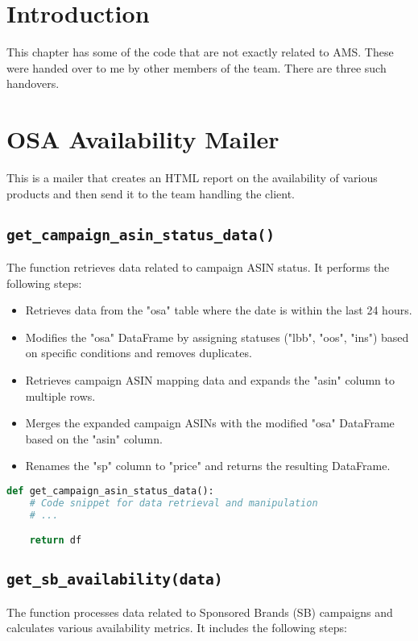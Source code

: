 \section{Introduction}

This chapter has some of the code that are not exactly related to AMS. These were handed over to me by other members of the team. There are three such handovers.

\section{OSA Availability Mailer}

This is a mailer that creates an HTML report on the availability of various products and then send it to the team handling the client.

\subsection{\texttt{get\_campaign\_asin\_status\_data()}}
The function retrieves data related to campaign ASIN status. It performs the following steps:
\begin{itemize}
    \item Retrieves data from the "osa" table where the date is within the last 24 hours.
    \item Modifies the "osa" DataFrame by assigning statuses ("lbb", "oos", "ins") based on specific conditions and removes duplicates.
    \item Retrieves campaign ASIN mapping data and expands the "asin" column to multiple rows.
    \item Merges the expanded campaign ASINs with the modified "osa" DataFrame based on the "asin" column.
    \item Renames the "sp" column to "price" and returns the resulting DataFrame.
\end{itemize}

\begin{lstlisting}[language=Python]
def get_campaign_asin_status_data():
    # Code snippet for data retrieval and manipulation
    # ...

    return df
\end{lstlisting}

\subsection{\texttt{get\_sb\_availability(data)}}
The function processes data related to Sponsored Brands (SB) campaigns and calculates various availability metrics. It includes the following steps:

